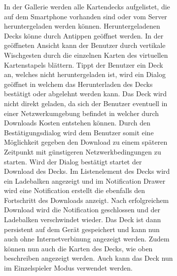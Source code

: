 \documentclass{scrartcl}
\begin{document}
\begin{figure}[!ht]
\begin{figure}[!ht]
\noindent
In der Gallerie werden alle Kartendecks aufgelistet, die auf dem Smartphone
vorhanden sind oder vom Server heruntergeladen werden können. Heruntergeladenen
Decks könne durch Antippen geöffnet werden. In der geöffneten Ansicht kann der
Benutzer durch vertikale Wischgesten durch die einzelnen Karten des virtuellen
Kartenstapels blättern. Tippt der Benutzer ein Deck an, welches nicht
heruntergeladen ist, wird ein Dialog geöffnet in welchem das Herunterladen des
Decks bestätigt oder abgelehnt werden kann. Das Deck wird nicht direkt geladen,
da sich der Benutzer eventuell in einer Netzwerkumgebung befindet in welcher
durch Downloads Kosten entstehen können. Durch den Bestätigungsdialog wird dem
Benutzer somit eine Möglichkeit gegeben den Download zu einem späteren Zeitpunkt
mit günstigeren Netzwerkbedingungen zu starten. Wird der Dialog bestätigt startet
der Download des Decks. Im Listenelement des Decks wird ein Ladebalken angezeigt
und im Notification Drawer wird eine Notification erstellt die ebenfalls den
Fortschritt des Downloads anzeigt. Nach erfolgreichem Download wird die
Notification geschlossen und der Ladebalken verschwindet wieder. Das Deck ist
dann persistent auf dem Gerät gespeichert und kann nun auch ohne
Internetverbinung angezeigt werden. Zudem können nun auch die Karten des Decks,
wie oben beschreiben angezeigt werden. Auch kann das Deck nun im Einzelspieler
Modus verwendet werden.


\end{figure}
\end{figure}
\end{document}
